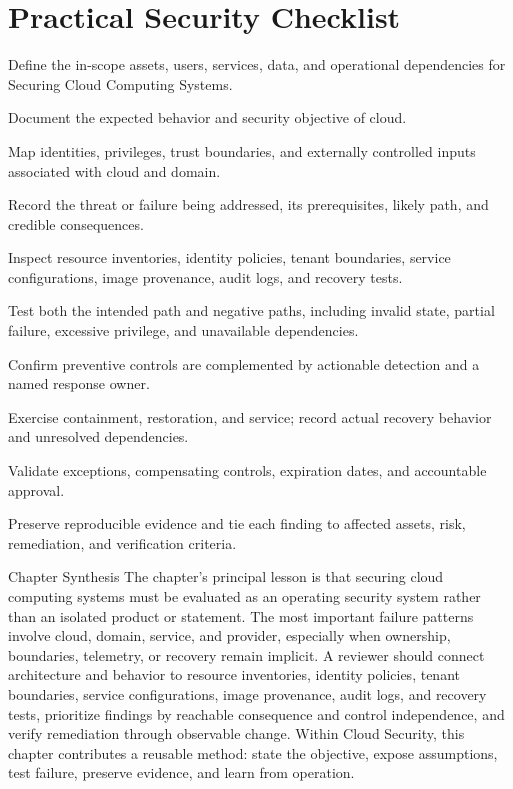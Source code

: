 \documentclass[11pt,letterpaper]{article}
\begin{document}
\section*{Practical Security Checklist}
\begin{CornellChecklist}
\item Define the in-scope assets, users, services, data, and operational dependencies for Securing Cloud Computing Systems.
\item Document the expected behavior and security objective of cloud.
\item Map identities, privileges, trust boundaries, and externally controlled inputs associated with cloud and domain.
\item Record the threat or failure being addressed, its prerequisites, likely path, and credible consequences.
\item Inspect resource inventories, identity policies, tenant boundaries, service configurations, image provenance, audit logs, and recovery tests.
\item Test both the intended path and negative paths, including invalid state, partial failure, excessive privilege, and unavailable dependencies.
\item Confirm preventive controls are complemented by actionable detection and a named response owner.
\item Exercise containment, restoration, and service; record actual recovery behavior and unresolved dependencies.
\item Validate exceptions, compensating controls, expiration dates, and accountable approval.
\item Preserve reproducible evidence and tie each finding to affected assets, risk, remediation, and verification criteria.
\end{CornellChecklist}
\begin{CornellSummaryBox}{Chapter Synthesis}
The chapter's principal lesson is that securing cloud computing systems must be evaluated as an operating security system rather than an isolated product or statement. The most important failure patterns involve cloud, domain, service, and provider, especially when ownership, boundaries, telemetry, or recovery remain implicit. A reviewer should connect architecture and behavior to resource inventories, identity policies, tenant boundaries, service configurations, image provenance, audit logs, and recovery tests, prioritize findings by reachable consequence and control independence, and verify remediation through observable change. Within Cloud Security, this chapter contributes a reusable method: state the objective, expose assumptions, test failure, preserve evidence, and learn from operation.
\end{CornellSummaryBox}
\end{document}
